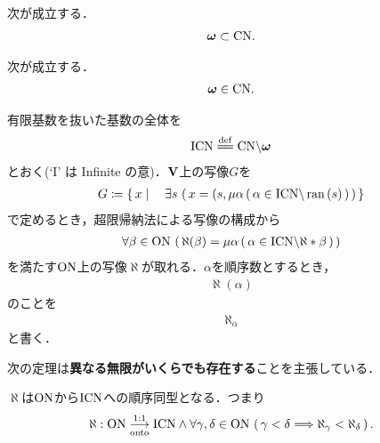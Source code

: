 	\begin{screen}
		\begin{thm}[自然数は基数]
			次が成立する．
			\begin{align}
				{\boldsymbol \omega} \subset \mathrm{CN}.
			\end{align}
		\end{thm}
	\end{screen}
	
	\begin{screen}
		\begin{thm}[$\Natural$は基数]
			次が成立する．
			\begin{align}
				{\boldsymbol \omega} \in \mathrm{CN}.
			\end{align}
		\end{thm}
	\end{screen}
	
	\begin{screen}
		\begin{dfn}[$\aleph$]
			有限基数を抜いた基数の全体を
			\begin{align}
				\InfCN \defeq \CN \backslash \Natural
			\end{align}
			とおく(`I' は Infinite の意)．$\mathbf{V}$上の写像$G$を
			\begin{align}
				G \coloneqq \left\{\, x \mid \quad \exists s\, \left(\, x=(s,\mu \alpha\, (\, \alpha \in \mathrm{ICN} \backslash \operatorname*{ran} \left(s\right)\, )\, \right)\, \right\}
			\end{align}
			で定めるとき，超限帰納法による写像の構成から
			\begin{align}
				\forall \beta \in \mathrm{ON}\, 
				\left(\, \aleph(\beta) = \mu \alpha\, (\, \alpha \in \mathrm{ICN} \backslash \aleph \ast \beta\, )\, \right)
			\end{align}
			を満たす$\mathrm{ON}$上の写像$\aleph$が取れる．$\alpha$を順序数とするとき，
			\begin{align}
				\aleph(\alpha)
			\end{align}
			のことを
			\begin{align}
				\aleph_\alpha
			\end{align}
			と書く．
		\end{dfn}
	\end{screen}
	
	次の定理は{\bf 異なる無限がいくらでも存在する}ことを主張している．
	
	\begin{screen}
		\begin{thm}
			$\aleph$は$\mathrm{ON}$から$\mathrm{ICN}$への順序同型となる．つまり
			\begin{align}
				\aleph:\mathrm{ON} \underset{\mathrm{onto}}{\overset{\mathrm{1:1}}{\longrightarrow}} \mathrm{ICN} \wedge \forall \gamma, \delta \in \mathrm{ON}\, \left(\, \gamma < \delta
				\Longrightarrow \aleph_\gamma < \aleph_\delta\, \right).
			\end{align}
		\end{thm}
	\end{screen}
	
